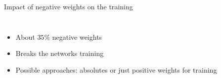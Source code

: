 \begin{frame}{Impact of negative weights on the training}
\begin{columns}
\begin{column}{0.5\textwidth}
\begin{figure}
            \end{figure}
        \end{column}
    \end{columns}
    \begin{itemize}
        \item About $35 \%$ negative weights
        \item Breaks the networks training
        \item Possible approaches: absolutes or just positive weights for training
    \end{itemize}
\end{frame}